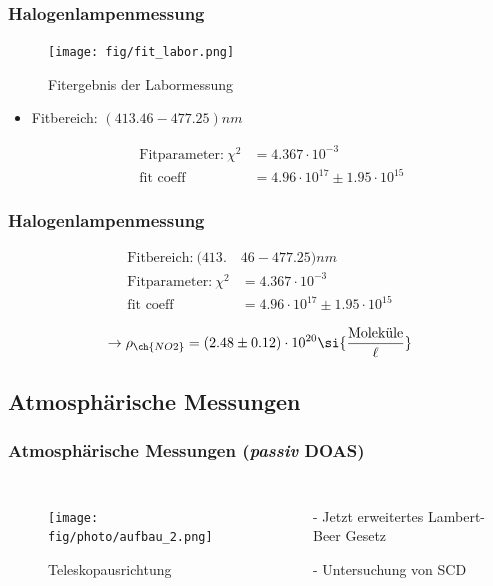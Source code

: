 \documentclass{beamer}
\begin{document}
\begin{frame}
	\frametitle{Halogenlampenmessung}
     \begin{figure}[h]
    	\texttt{[image: fig/fit\_labor.png]}
    	\caption{Fitergebnis der  Labormessung}
    \end{figure}

    \begin{itemize} 
    	\item Fitbereich: $(413.46 - 477.25) \si{nm}$
    	
    		\begin{align}
    		   \text{Fitparameter:}\ \chi^2 &= 4.367 \cdot 10^{-3}\\
    		   \text{fit coeff} &= 4.96 \cdot 10^{17} \pm 1.95 \cdot 10^{15}
    		\end{align}
    		
    \end{itemize}
\end{frame} 

\begin{frame}
	\frametitle{Halogenlampenmessung}
	\begin{align}
		\text{Fitbereich:}\ (413.&46 - 477.25) \si{nm}\\
		\text{Fitparameter:}\ \chi^2 &= 4.367 \cdot 10^{-3}\\
		\text{fit coeff} &= 4.96 \cdot 10^{17} \pm 1.95 \cdot 10^{15}
	\end{align}
	
	\begin{align}    
		\to \rho_{\ch{NO2}} = (2.48 \pm 0.12) \cdot 10^{20} \si{\frac{\text{Moleküle}}{\ell}}
	\end{align}
\end{frame}

\begin{frame}
    \section{Atmosphärische Messungen}
    \frametitle{Atmosphärische Messungen (\textit{passiv} DOAS)}
    \begin{columns}
    	\begin{figure}[h]
    		\texttt{[image: fig/photo/aufbau\_2.png]}
    		\caption{Teleskopausrichtung}
    	\end{figure}
    	\begin{itemize}
    		\item[-] Jetzt erweitertes Lambert-Beer Gesetz
    		\item[-] Untersuchung von SCD
    	\end{itemize}
    \end{columns}
\end{frame}
\end{document}
